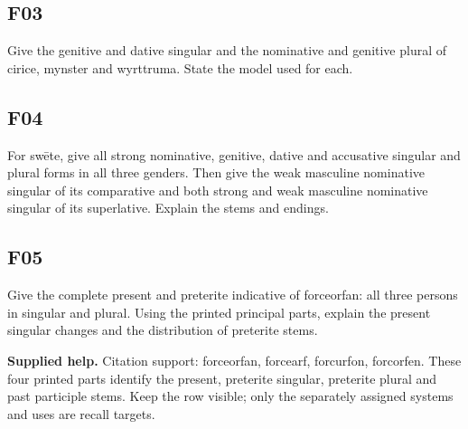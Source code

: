 \par\begin{minipage}{\linewidth}\raggedright
\subsection*{F03}

Give the genitive and dative singular and the nominative and genitive plural of cirice, mynster and wyrttruma. State the model used for each.

\end{minipage}\par\addvspace{4pt}

\par\begin{minipage}{\linewidth}\raggedright
\subsection*{F04}

For swēte, give all strong nominative, genitive, dative and accusative singular and plural forms in all three genders. Then give the weak masculine nominative singular of its comparative and both strong and weak masculine nominative singular of its superlative. Explain the stems and endings.

\end{minipage}\par\addvspace{4pt}

\par\begin{minipage}{\linewidth}\raggedright
\subsection*{F05}

Give the complete present and preterite indicative of forceorfan: all three persons in singular and plural. Using the printed principal parts, explain the present singular changes and the distribution of preterite stems.

\textbf{Supplied help.} Citation support: forceorfan, forcearf, forcurfon, forcorfen. These four printed parts identify the present, preterite singular, preterite plural and past participle stems. Keep the row visible; only the separately assigned systems and uses are recall targets.

\end{minipage}\par\addvspace{4pt}

